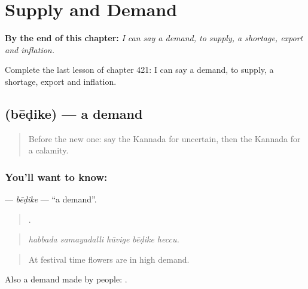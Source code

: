
\chapter{Supply and Demand}
\label{ch:ka-supply-and-demand}

\begin{chapteropening}
\textbf{By the end of this chapter:} \emph{I can say a demand, to supply, a shortage, export and inflation.}

Complete the last lesson of chapter 421: I can say a demand, to supply, a shortage, export and inflation.
\end{chapteropening}

\section[\texorpdfstring{\kn{ಬೇಡಿಕೆ} (bēḍike)}{ಬೇಡಿಕೆ (bēḍike)}]{ (bēḍike) — a demand}

\label{lesson:KA-C421-bedike}



\begin{quote}
Before the new one: say the Kannada for uncertain, then the Kannada for a calamity.
\end{quote}

\subsection*{You'll want to know: }
\textbf{} — \emph{bēḍike} — \textquotedblleft{}a demand\textquotedblright{}.

\begin{quote}
    .
\end{quote}

\begin{quote}
\emph{habbada samayadalli hūvige bēḍike heccu.}
\end{quote}

\begin{quote}
At festival time flowers are in high demand.
\end{quote}

Also a demand made by people:  .

